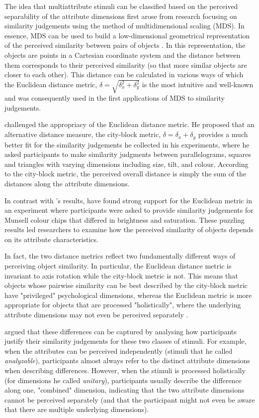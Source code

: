 \documentclass[11pt,a4paper]{article}
\begin{document}
The idea that multiattribute stimuli can be classified based on the perceived separability of the attribute dimensions first arose from research focusing on similarity judgements using the method of multidimensional scaling (MDS). In essence, MDS can be used to build a low-dimensional geometrical representation of the perceived similarity between pairs of objects \cite{Hout2013}. In this representation, the objects are points in a Cartesian coordinate system and the distance between them corresponds to their perceived similarity (so that more similar objects are closer to each other). This distance can be calculated in various ways of which the Euclidean distance metric, $\delta = \sqrt{\delta_x^2 + \delta_y^2} $ is the most intuitive and well-known and was consequently used in the first applications of MDS to similarity judgements.

 challenged the appropriacy of the Euclidean distance metric. He proposed that an alternative distance measure, the city-block metric, $\delta = \delta_x + \delta_y $ provides a much better fit for the similarity judgements he collected in his experiments, where he asked participants to make similarity judgments between parallelograms, squares and triangles with varying dimensions including size, tilt, and colour. According to the city-block metric, the perceived overall distance is simply the sum of the distances along the attribute dimensions.  

In contrast with \citeauthor{Attneave1950}'s results,  have found strong support for the Euclidean metric in an experiment where participants were asked to provide similarity judgements for Munsell colour chips that differed in brightness and saturation. These puzzling results led researchers to examine how the perceived similarity of objects depends on its attribute characteristics. 

In fact, the two distance metrics reflect two fundamentally different ways of perceiving object similarity. In particular, the Euclidean distance metric is invariant to axis rotation while the city-block metric is not. This means that objects whose pairwise similarity can be best described by the city-block metric have "privileged" psychological dimensions, whereas the Euclidean metric is more appropriate for objects that are processed "holistically", where the underlying attribute dimensions may not even be perceived separately \cite{Shepp1989}. 

 argued that these differences can be captured by analysing how participants justify their similarity judgements for these two classes of stimuli. For example, when the attributes can be perceived independently (stimuli that he called \textit{analyzable}), participants almost always refer to the distinct attribute dimensions when describing differences. However, when the stimuli is processed holistically (for dimensions he called \textit{unitary}), participants usually describe the difference along one, "combined" dimension, indicating that the two attribute dimensions cannot be perceived separately (and that the participant might not even be aware that there are multiple underlying dimensions). 
\end{document}
